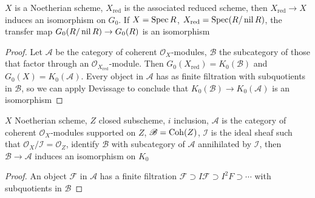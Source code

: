 \documentclass[main]{subfiles}
\begin{document}
\begin{proposition}
$X$ is a Noetherian scheme, $X_{\text{red}}$ is the associated reduced scheme, then $X_{\text{red}}\to X$ induces an isomorphism on $G_0$. If $X=\operatorname{Spec} R$, $X_{\text{red}}=\operatorname{Spec}(R/\operatorname{nil} R)$, the transfer map $G_0(R/\operatorname{nil} R)\to G_0(R)$ is an isomorphism
\end{proposition}

\begin{proof}
Let $\mathscr A$ be the category of coherent $\mathcal O_X$-modules, $\mathscr B$ the subcategory of those that factor through an $\mathcal O_{X_{\text{red}}}$-module. Then $G_0(X_{\text{red}})=K_0(\mathscr B)$ and $G_0(X)=K_0(\mathscr A)$. Every object in $\mathscr A$ has as finite filtration with subquotients in $\mathscr B$, so we can apply Devissage to conclude that $K_0(\mathscr B)\to K_0(\mathscr A)$ is an isomorphism
\end{proof}

\begin{proposition}
$X$ Noetherian scheme, $Z$ closed subscheme, $i$ inclusion, $\mathscr A$ is the category of coherent $\mathcal O_X$-modules supported on $Z$, $\mathscr B=\operatorname{Coh}(Z)$, $\mathcal I$ is the ideal sheaf such that $\mathcal O_X/\mathcal I=\mathcal O_Z$, identify $\mathscr B$ with subcategory of $\mathscr A$ annihilated by $\mathcal I$, then $\mathscr B\to\mathscr A$ induces an isomorphism on $K_0$
\end{proposition}

\begin{proof}
An object $\mathcal F$ in $\mathscr A$ has a finite filtration $\mathcal F\supset I\mathcal F\supset I^2F\supset\cdots$ with subquotients in $\mathscr B$
\end{proof}
\end{document}
